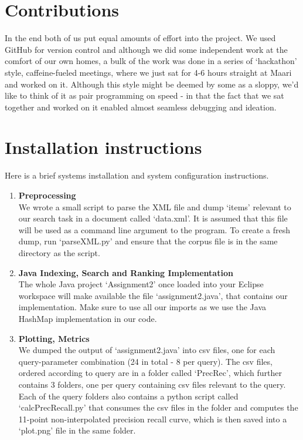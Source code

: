\section{Contributions}

In the end both of us put equal amounts of effort into the project. We used GitHub for version control and although we did some independent work at the comfort of our own homes, a bulk of the work was done in a series of \lq hackathon' style, caffeine-fueled meetings, where we just sat for 4-6 hours straight at Maari and worked on it. Although this style might be deemed by some as a sloppy, we'd like to think of it as pair programming on speed - in that the fact that we sat together and worked on it enabled almost seamless debugging and ideation.\\

\clearpage

\nocite{*}




\clearpage
\appendix
\section{Installation instructions} \label{App:instructions}

Here is a brief systems installation and system configuration instructions. 

\begin{enumerate}

\item {\bf Preprocessing} \\
We wrote a small script to parse the XML file and dump \lq items' relevant to our search task
in a document called \lq data.xml'. It is assumed that this file will be used as a command line
argument to the program. To create a fresh dump, run \lq parseXML.py' and ensure that the corpus
file is in the same directory as the script. 
\item {\bf Java Indexing, Search and Ranking Implementation} \\
The whole Java project \lq Assignment2' once loaded into your Eclipse workspace
will make available the file \lq assignment2.java', that contains our implementation. 
Make sure to use all our imports as we use the Java HashMap implementation in our code.
\item {\bf Plotting, Metrics} \\
We dumped the output of \lq assignment2.java' into csv files, one for each query-parameter
combination (24 in total - 8 per query). The csv files, ordered according to query are in
a folder called \lq PrecRec', which further contains 3 folders, one per query containing csv
files relevant to the query. Each of the query folders also contains a python script called \lq calcPrecRecall.py\rq 
that consumes the csv files in the folder and computes the 11-point non-interpolated precision recall curve,
which is then saved into a \lq plot.png' file in the same folder. 
\end{enumerate}


